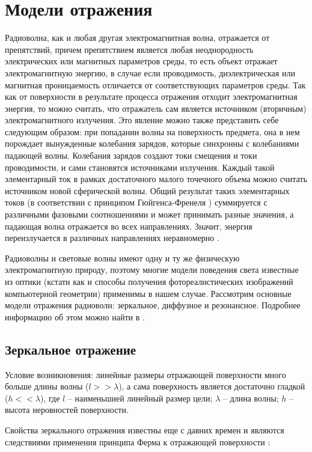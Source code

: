 \newpage
\section*{Модели отражения} 

Радиоволна, как и любая другая электромагнитная волна, отражается от препятствий, причем препятствием является любая неоднородность электрических или магнитных параметров среды, то есть объект отражает электромагнитную энергию, в случае если проводимость, диэлектрическая или магнитная проницаемость отличается от соответствующих параметров среды.
Так как от поверхности в результате процесса отражения отходит электромагнитная энергия, то можно считать, что отражатель сам является источником (вторичным) электромагнитного излучения. Это явление можно также представить себе следующим образом: при попадании волны на поверхность предмета, она в нем порождает вынужденные колебания зарядов, которые синхронны с колебаниями падающей волны. Колебания зарядов создают токи смещения и токи проводимости, и сами становятся источниками излучения. Каждый такой элементарный ток в рамках достаточного малого точечного объема можно считать источником новой сферической волны. Общий результат таких элементарных токов (в соответствии с принципом Гюйгенса-Френеля \cite{gugens}) суммируется с различными фазовыми соотношениями и может принимать разные значения, а падающая волна отражается во всех направлениях. Значит, энергия переизлучается в различных направлениях неравномерно \cite{radiolocation}.

Радиоволны и световые волны имеют одну и ту же физическую электромагнитную природу, поэтому многие модели поведения света известные из оптики (кстати как и способы получения фотореалистических изображений компьютерной геометрии) применимы в нашем случае. Рассмотрим основные модели отражения радиоволн: зеркальное, диффузное и резонансное. Подробнее информацию об этом можно найти в \cite{radiolocation}.

\subsection*{Зеркальное отражение}

Условие возникновения: линейные размеры отражающей поверхности много больше длины волны ($ l >> \lambda $), а сама поверхность является достаточно гладкой ($ h << \lambda $), где $ l $ -- наименьшией линейный размер цели; $ \lambda $ -- длина волны; $ h $ -- высота неровностей поверхности. 

Свойства зеркального отражения известны еще с давних времен и являются следствиями применения принципа Ферма к отражающей поверхности \cite{ferma}:

